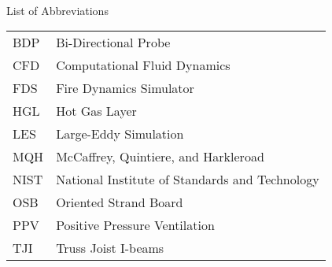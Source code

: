 
\renewcommand{\baselinestretch}{1}
\small\normalsize
\hbox{\ }

\vspace{-3em}


\begin{center}
\large{List of Abbreviations}
\end{center} 

\vspace{3pt}

\begin{tabular}{ll}
BDP & Bi-Directional Probe \\
CFD & Computational Fluid Dynamics  \\
FDS & Fire Dynamics Simulator \\
HGL & Hot Gas Layer \\
LES & Large-Eddy Simulation \\
MQH  & McCaffrey, Quintiere, and Harkleroad \\
NIST & National Institute of Standards and Technology \\
OSB & Oriented Strand Board \\
PPV & Positive Pressure Ventilation \\
TJI & Truss Joist I-beams \\
\end{tabular}
